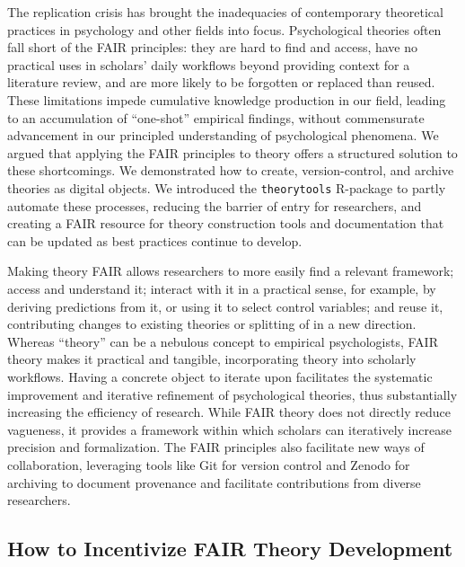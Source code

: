 \documentclass[
  man, noextraspace,floatsintext]{apa7}
\begin{document}
The replication crisis has brought the inadequacies of contemporary theoretical practices in psychology and other fields into focus.
Psychological theories often fall short of the FAIR principles:
they are hard to find and access, have no practical uses in scholars' daily workflows beyond providing context for a literature review,
and are more likely to be forgotten or replaced than reused.
These limitations impede cumulative knowledge production in our field,
leading to an accumulation of ``one-shot'' empirical findings, without commensurate advancement in our principled understanding of psychological phenomena.
We argued that applying the FAIR principles to theory offers a structured solution to these shortcomings.
We demonstrated how to create, version-control, and archive theories as digital objects.
We introduced the \texttt{theorytools} R-package to partly automate these processes, reducing the barrier of entry for researchers,
and creating a FAIR resource for theory construction tools and documentation that can be updated as best practices continue to develop.

Making theory FAIR allows researchers to more easily find a relevant framework;
access and understand it; interact with it in a practical sense, for example, by deriving predictions from it, or using it to select control variables; and reuse it, contributing changes to existing theories or splitting of in a new direction.
Whereas ``theory'' can be a nebulous concept to empirical psychologists,
FAIR theory makes it practical and tangible, incorporating theory into scholarly workflows.
Having a concrete object to iterate upon facilitates the systematic improvement and iterative refinement of psychological theories, thus substantially increasing the efficiency of research.
While FAIR theory does not directly reduce vagueness,
it provides a framework within which scholars can iteratively increase precision and formalization.
The FAIR principles also facilitate new ways of collaboration,
leveraging tools like Git for version control and Zenodo for archiving to document provenance and facilitate contributions from diverse researchers.

\subsection{How to Incentivize FAIR Theory Development}\label{how-to-incentivize-fair-theory-development}
\end{document}
